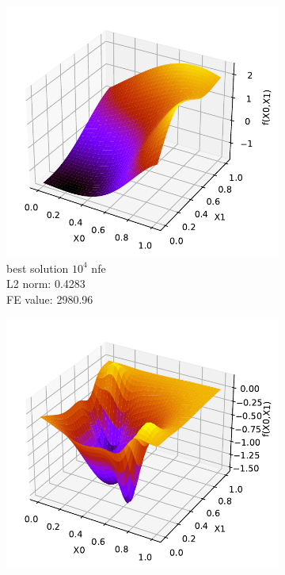 \documentclass[./\jobname.tex]{subfiles}
\begin{document}
\begin{figure}[H]
	\centering
	\begin{subfigure}[b]{0.3333\linewidth}
		\centering
		\includegraphics[width=1\textwidth]{../../code/experiments/experiment_0/pde5_best_sol_10_4.pdf}
		\caption{best solution $10^4$ \gls{nfe} \\ L2 norm: 0.4283 \\ FE value: 2980.96}
		\label{fig:pde5_sol_10_4}
	\end{subfigure}%
	\begin{subfigure}[b]{0.3333\linewidth}
		\centering
		\includegraphics[width=1\textwidth]{../../code/experiments/experiment_0/pde5_best_sol_10_6.pdf}

\end{subfigure}
\end{figure}
\end{document}
